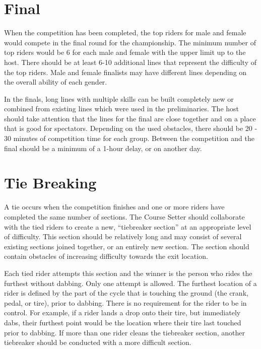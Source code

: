 \section{Final}

When the competition has been completed, the top riders for male and female would compete in the final round for the championship.
The minimum number of top riders would be 6 for each male and female with the upper limit up to the host. 
There should be at least 6-10 additional lines that represent the difficulty of the top riders. 
Male and female finalists may have different lines depending on the overall ability of each gender.

In the finals, long lines with multiple skills can be built completely new or combined from existing lines which were used in the preliminaries. 
The host should take attention that the lines for the final are close together and on a place that is good for spectators. Depending on the used obstacles, there should be 20 - 30 minutes of competition time for each group. 
Between the competition and the final should be a minimum of a 1-hour delay, or on another day.
 
\section{Tie Breaking}
A tie occurs when the competition finishes and one or more riders have completed the same number of sections.
The Course Setter should collaborate with the tied riders to create a new, ``tiebreaker section'' at an appropriate level of difficulty. 
This section should be relatively long and may consist of several existing sections joined together, or an entirely new section.
The section should contain obstacles of increasing difficulty towards the exit location.

Each tied rider attempts this section and the winner is the person who rides the furthest without dabbing.
Only one attempt is allowed. 
The furthest location of a rider is defined by the part of the cycle that is touching the ground (the crank, pedal, or tire), prior to dabbing. 
There is no requirement for the rider to be in control. 
For example, if a rider lands a drop onto their tire, but immediately dabs, their furthest point would be the location where their tire last touched prior to dabbing.
If more than one rider cleans the tiebreaker section, another tiebreaker should be conducted with a more difficult section.
